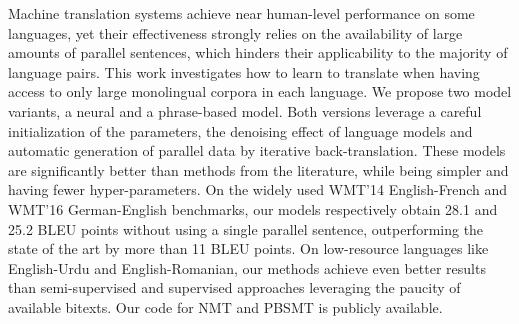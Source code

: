 Machine translation systems achieve near human-level performance on some languages, yet their effectiveness strongly relies on the availability of large amounts of parallel sentences, which hinders their applicability to the majority of language pairs. This work investigates how to learn to translate when having access to only large monolingual corpora in each language. We propose two model variants, a neural and a phrase-based model. Both versions leverage a careful initialization of the parameters, the denoising effect of language models and automatic generation of parallel data by iterative back-translation. These models are significantly better than methods from the literature, while being simpler and having fewer hyper-parameters. On the widely used WMT'14 English-French and WMT'16 German-English benchmarks, our models respectively obtain 28.1 and 25.2 BLEU points without using a single parallel sentence, outperforming the state of the art by more than 11 BLEU points. On low-resource languages like English-Urdu and English-Romanian, our methods achieve even better results than semi-supervised and supervised approaches leveraging the paucity of available bitexts. Our code for NMT and PBSMT is publicly available.
